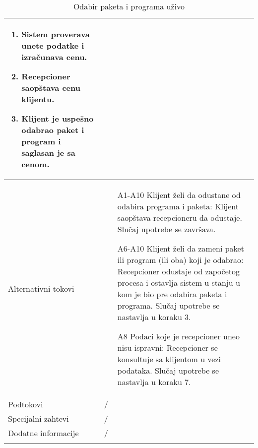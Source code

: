 \documentclass[../main.tex]{subfiles}
\begin{document}
\begin{longtable}{| p{} | p{} |}
\begin{enumerate}
        \item Sistem proverava unete podatke i izračunava cenu.
        \item Recepcioner saopštava cenu klijentu.
        \item Klijent je uspešno odabrao paket i program i saglasan je sa cenom.
    \end{enumerate}\\
\hline
    Alternativni tokovi & \begin{itemize}
        \item [A1-A10] Klijent želi da odustane od odabira programa i paketa: Klijent saopštava recepcioneru da odustaje. Slučaj upotrebe se završava.
        \item [A6-A10] Klijent želi da zameni paket ili program (ili oba) koji je odabrao: Recepcioner odustaje od započetog procesa i ostavlja sistem u stanju u kom je bio pre odabira paketa i programa. Slučaj upotrebe se nastavlja u koraku 3.
        \item [A8] Podaci koje je recepcioner uneo nisu ispravni: Recepcioner se konsultuje sa klijentom u vezi podataka. Slučaj upotrebe se nastavlja u koraku 7.
        \end{itemize}\\
\hline
    Podtokovi & /\\
\hline
    Specijalni zahtevi & /\\
\hline
    Dodatne informacije & /\\
\hline
\caption{Odabir paketa i programa uživo} %
\end{longtable}
\end{document}
